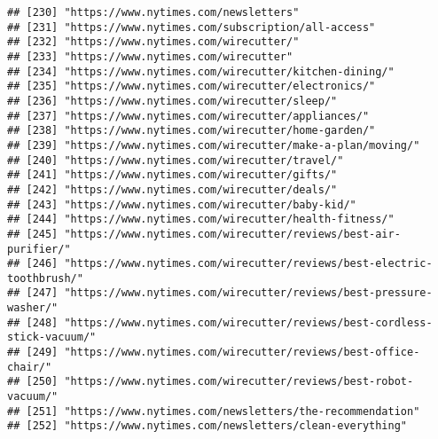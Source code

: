 \documentclass[
]{article}
\begin{document}
\begin{verbatim}
## [230] "https://www.nytimes.com/newsletters"                                                                       
## [231] "https://www.nytimes.com/subscription/all-access"                                                           
## [232] "https://www.nytimes.com/wirecutter/"                                                                       
## [233] "https://www.nytimes.com/wirecutter"                                                                        
## [234] "https://www.nytimes.com/wirecutter/kitchen-dining/"                                                        
## [235] "https://www.nytimes.com/wirecutter/electronics/"                                                           
## [236] "https://www.nytimes.com/wirecutter/sleep/"                                                                 
## [237] "https://www.nytimes.com/wirecutter/appliances/"                                                            
## [238] "https://www.nytimes.com/wirecutter/home-garden/"                                                           
## [239] "https://www.nytimes.com/wirecutter/make-a-plan/moving/"                                                    
## [240] "https://www.nytimes.com/wirecutter/travel/"                                                                
## [241] "https://www.nytimes.com/wirecutter/gifts/"                                                                 
## [242] "https://www.nytimes.com/wirecutter/deals/"                                                                 
## [243] "https://www.nytimes.com/wirecutter/baby-kid/"                                                              
## [244] "https://www.nytimes.com/wirecutter/health-fitness/"                                                        
## [245] "https://www.nytimes.com/wirecutter/reviews/best-air-purifier/"                                             
## [246] "https://www.nytimes.com/wirecutter/reviews/best-electric-toothbrush/"                                      
## [247] "https://www.nytimes.com/wirecutter/reviews/best-pressure-washer/"                                          
## [248] "https://www.nytimes.com/wirecutter/reviews/best-cordless-stick-vacuum/"                                    
## [249] "https://www.nytimes.com/wirecutter/reviews/best-office-chair/"                                             
## [250] "https://www.nytimes.com/wirecutter/reviews/best-robot-vacuum/"                                             
## [251] "https://www.nytimes.com/newsletters/the-recommendation"                                                    
## [252] "https://www.nytimes.com/newsletters/clean-everything"                                                      

\end{verbatim}
\end{document}

